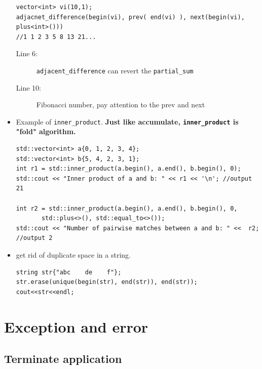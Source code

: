 \documentclass[a4paper,11pt,twoside]{book}
\begin{document}
\begin{itemize}
\begin{lstlisting}
vector<int> vi(10,1);
adjacnet_difference(begin(vi), prev( end(vi) ), next(begin(vi), plus<int>()))
//1 1 2 3 5 8 13 21...
\end{lstlisting}
\begin{description}
\item[Line 6:] \texttt{adjacent\_difference} can revert the \texttt{partial\_sum}
\item[Line 10:] Fibonacci number, pay attention to the prev and next
\end{description}

\item  Example of \texttt{inner\_product}. \textbf{Just like accumulate, \texttt{inner\_product} is "fold" algorithm.}

\begin{lstlisting}
std::vector<int> a{0, 1, 2, 3, 4};
std::vector<int> b{5, 4, 2, 3, 1};
int r1 = std::inner_product(a.begin(), a.end(), b.begin(), 0);
std::cout << "Inner product of a and b: " << r1 << '\n'; //output 21

int r2 = std::inner_product(a.begin(), a.end(), b.begin(), 0,
       std::plus<>(), std::equal_to<>());
std::cout << "Number of pairwise matches between a and b: " <<  r2; //output 2
\end{lstlisting}

\item get rid of duplicate space in a string.
\begin{lstlisting}
string str{"abc    de    f"};
str.erase(unique(begin(str), end(str)), end(str));
cout<<str<<endl;
\end{lstlisting}

\end{itemize}


\chapter{Exception and error}
\section{Terminate application}
\end{document}
